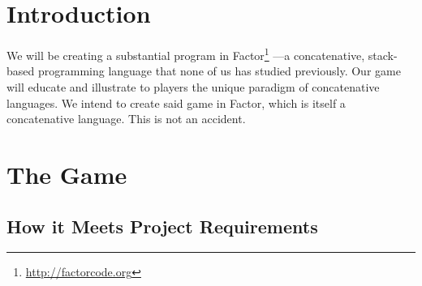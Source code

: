 \documentclass{sig-alternate}
\begin{document}



\section{Introduction}
We will be creating a substantial program in Factor\footnote{ \url{http://factorcode.org}} ---a concatenative, stack-based
programming language that none of us has studied previously. 
Our game will educate and illustrate to players the
unique paradigm of concatenative languages. We intend to create
said game in Factor, which is itself a concatenative language.
This is not an accident. 

\section{The Game} \subsection{How it Meets Project Requirements}
\end{document}
